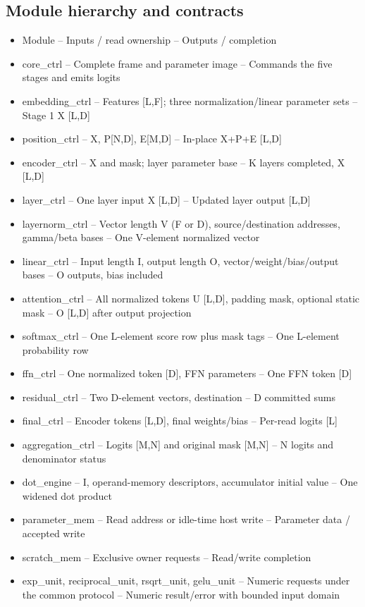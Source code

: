 \documentclass[11pt,a4paper]{article}
\begin{document}
\subsection{Module hierarchy and contracts}
\begin{itemize}
\item Module -- Inputs / read ownership -- Outputs / completion
\item core\_ctrl -- Complete frame and parameter image -- Commands the five stages and emits logits
\item embedding\_ctrl -- Features [L,F]; three normalization/linear parameter sets -- Stage 1 X [L,D]
\item position\_ctrl -- X, P[N,D], E[M,D] -- In-place X+P+E [L,D]
\item encoder\_ctrl -- X and mask; layer parameter base -- K layers completed, X [L,D]
\item layer\_ctrl -- One layer input X [L,D] -- Updated layer output [L,D]
\item layernorm\_ctrl -- Vector length V (F or D), source/destination addresses, gamma/beta bases -- One V-element normalized vector
\item linear\_ctrl -- Input length I, output length O, vector/weight/bias/output bases -- O outputs, bias included
\item attention\_ctrl -- All normalized tokens U [L,D], padding mask, optional static mask -- O [L,D] after output projection
\item softmax\_ctrl -- One L-element score row plus mask tags -- One L-element probability row
\item ffn\_ctrl -- One normalized token [D], FFN parameters -- One FFN token [D]
\item residual\_ctrl -- Two D-element vectors, destination -- D committed sums
\item final\_ctrl -- Encoder tokens [L,D], final weights/bias -- Per-read logits [L]
\item aggregation\_ctrl -- Logits [M,N] and original mask [M,N] -- N logits and denominator status
\item dot\_engine -- I, operand-memory descriptors, accumulator initial value -- One widened dot product
\item parameter\_mem -- Read address or idle-time host write -- Parameter data / accepted write
\item scratch\_mem -- Exclusive owner requests -- Read/write completion
\item exp\_unit, reciprocal\_unit, rsqrt\_unit, gelu\_unit -- Numeric requests under the common protocol -- Numeric result/error with bounded input domain
\end{itemize}
\end{document}
